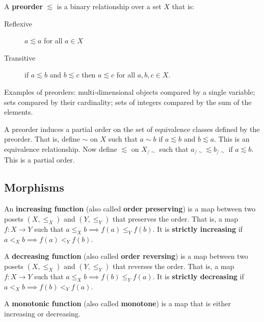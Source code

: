 \documentclass{bareminimum}
\begin{document}
\begin{defn}[Preorder]
	A \textbf{preorder}  $\lesssim$ is a binary relationship over a set $X$ that is:
	\begin{description}
		\item[Reflexive] $a \lesssim a$ for all $a \in X$
		\item[Transitive] if $a \lesssim b$ and $b \lesssim c$ then $a \lesssim c$ for all $a, b, c \in X$.
	\end{description}
\end{defn}

Examples of preorders: multi-dimensional objects compared by a single variable; sets compared by their cardinality; sets of integers compared by the sum of the elements.

\begin{prop}
	A preorder induces a partial order on the set of equivalence classes defined by the preorder. That is, define $\sim$ on $X$ such that $a \sim b$ if $a \lesssim b$ and $b \lesssim a$. This is an equivalence relationship. Now define $\lesssim$ on $X_{/\sim}$ such that $a_{/\sim} \lesssim b_{/\sim}$ if $a \lesssim b$. This is a partial order.
\end{prop}

\subsection{Morphisms}

\begin{defn}
	An \textbf{increasing function}  (also called \textbf{order preserving}) is a map between two posets $(X, \leq_X)$ and $(Y, \leq_Y)$ that preserves the order. That is, a map $f : X \to Y$ such that $a \leq_X b \implies f(a) \leq_Y f(b)$. It is \textbf{strictly increasing} if $a <_X b \implies f(a) <_Y f(b)$.
\end{defn}

\begin{defn}
	A \textbf{decreasing function}  (also called \textbf{order reversing}) is a map between two posets $(X, \leq_X)$ and $(Y, \leq_Y)$ that reverses the order. That is, a map $f : X \to Y$ such that $a \leq_X b \implies f(b) \leq_Y f(a)$.  It is \textbf{strictly decreasing} if $a <_X b \implies f(b) <_Y f(a)$.
\end{defn}

\begin{defn}
	A \textbf{monotonic function}  (also called \textbf{monotone}) is a map that is either increasing or decreasing.
\end{defn}
\end{document}
